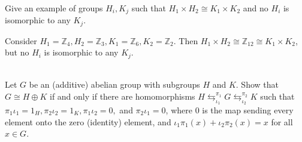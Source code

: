 \documentclass{article}
\def\zz{{\mathbb Z}}
\begin{document}
\begin{problem}[1.8.2] \\ 
    Give an example of groups $H_i, K_j$ such that $H_1 \times H_2 \cong K_1 \times K_2$ and no $H_i$ is isomorphic to any $K_j$.
\end{problem}
Consider $H_1 = \zz_4, H_2 = \zz_3, K_1 = \zz_6, K_2 = \zz_2$. Then $H_1 \times H_2 \cong \zz_{12} \cong K_1 \times K_2$, but no $H_i$ is isomorphic to any $K_j$.



\begin{problem}[1.8.3] \\ 
    Let $G$ be an (additive) abelian group with subgroups $H$ and $K$. Show that $G \cong H \oplus K$ if and only if there are homomorphisms $H \mathrel{\mathop{\leftrightarrows}^{{\pi_1}}_{\iota_1}} G \mathrel{\mathop{\leftrightarrows}^{{\pi_2}}_{\iota_2}} K$ such that $\pi_1\iota_1 = 1_H, \pi_2\iota_2 = 1_K, \pi_1\iota_2 = 0,$ and $\pi_2\iota_1 = 0$, where $0$ is the map sending every element onto the zero (identity) element, and $\iota_1\pi_1(x) + \iota_2\pi_2(x) = x$ for all $x \in G$.
\end{problem}
\end{document}
